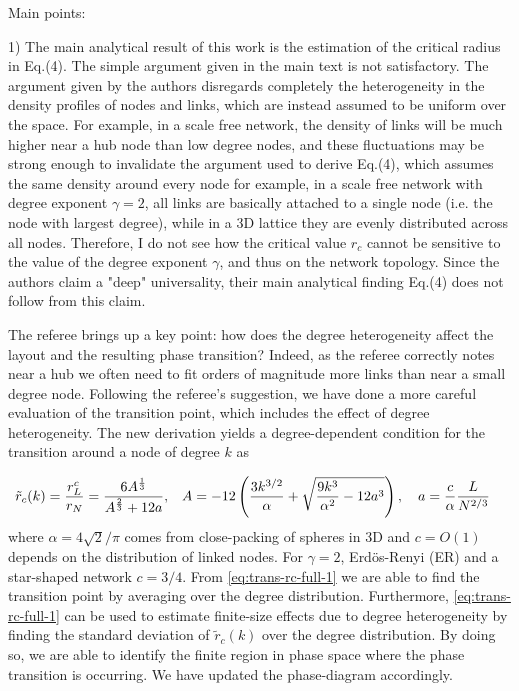 \documentclass[11pt]{article}
\begin{document}
\noindent
Main points:
\begin{response}{
1) The main analytical result of this work is the estimation of the critical radius in Eq.(4). 
The simple argument given in the main text is not satisfactory. 
The argument given by the authors disregards completely the heterogeneity in the density profiles of nodes and links, which are instead assumed to be uniform over the space. 
For example, in a scale free network, the density of links will be much higher near a hub node than low degree nodes, and these fluctuations may be strong enough to invalidate the argument used to derive Eq.(4), which assumes the same density around every node for example, in a scale free network with degree exponent $\gamma=2$, all links are basically 
attached to a single node (i.e. the node with largest degree), while in a 3D lattice they are evenly distributed across all nodes. Therefore, I do not see how the critical value $r_c$ cannot be sensitive to the value of the degree exponent $\gamma$, and thus on the network topology. Since the authors claim a "deep" universality, their main analytical finding Eq.(4) does not follow from this claim.

}

The referee brings up a key point: how does the degree heterogeneity affect the layout and the resulting phase transition? 
Indeed, as the referee correctly notes near a hub we often need to fit orders of magnitude more links than near a small degree node. 
Following the referee's suggestion, we have done a more careful evaluation of the transition point, which includes the effect of degree heterogeneity. 
The new derivation yields a degree-dependent condition for the transition around a node of degree $k$ as  

\begin{align}
    \tilde{r}_c(k) = {r^c_L\over r_N} 
    &=\frac{6A^{{1\over 3}}}{A^{\frac{2}{3}} + 12 a}, &A& =- 12 \left({ 3k^{3/2}\over \alpha } + \sqrt{{ 9 k^{3}\over \alpha^2 }- 12 a^3 }\right),\quad a = {c\over \alpha}{L\over N^{2/3}} \label{eq:trans-rc-full-1}
\end{align}
where $\alpha = 4\sqrt{2}/\pi $ comes from close-packing of spheres in 3D and $c = O(1)$ depends on the distribution of linked nodes. 
For $\gamma = 2$, Erd\"os-Renyi (ER) and a star-shaped network $c = 3/4$. 
From \eqref{eq:trans-rc-full-1} we are able to find the transition point by averaging over the degree distribution. 
Furthermore, \eqref{eq:trans-rc-full-1} can be used to estimate finite-size effects due to degree heterogeneity by finding the standard deviation of $\tilde{r}_c(k)$ over the degree distribution. 
By doing so, we are able to identify the finite region in phase space where the phase transition is occurring. 
We have updated the phase-diagram accordingly. 


\end{response}
\end{document}
